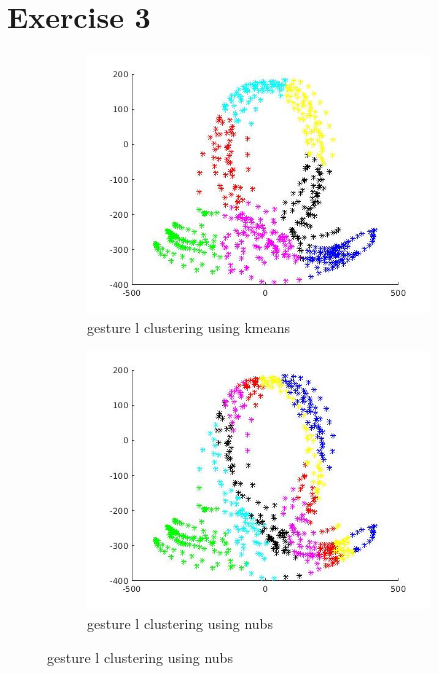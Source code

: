 \documentclass{article}
\begin{document}
\section*{Exercise 3}
\begin{figure}[ht]
	\begin{subfigure}{.5\textwidth}
		\centering
		\includegraphics[width=1.\linewidth]{kmean1.jpg}  
		\caption{gesture l clustering using kmeans}
	\end{subfigure}
	\begin{subfigure}{.5\textwidth}
		\centering
		\includegraphics[width=1.\linewidth]{nubs1.jpg}  
		\caption{gesture l clustering using nubs}
	\end{subfigure}

\end{figure}
\end{document}
